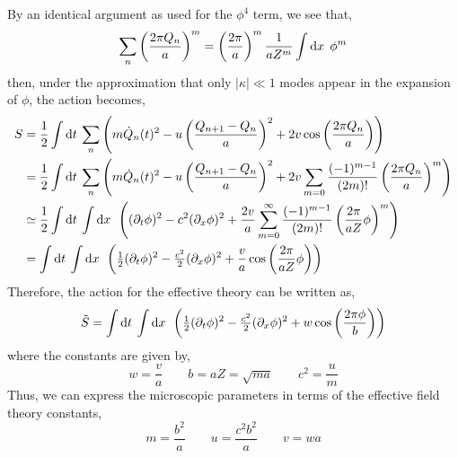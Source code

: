 \documentclass[12pt]{extarticle}
\begin{document}
By an identical argument as used for the $\phi^4$ term, we see that,
\[ \sum_{n} \left(\frac{2 \pi Q_n}{a} \right)^m = \left(\frac{2 \pi}{a} \right)^m \frac{1}{a Z^m} \int \mathrm{d}x \: \: \phi^m \]
then, under the approximation that only $|\kappa| \ll 1$ modes appear in the expansion of $\phi$, the action becomes,
\begin{align*}
S & = \frac{1}{2} \int \mathrm{d}t \: \sum_{n} \left(m \dot{Q}_n(t)^2 - u \left(\frac{Q_{n+1} - Q_{n}}{a}\right)^2 + 2 v \cos{\left(\frac{2 \pi Q_n}{a} \right)} \right) 
\\
& = \frac{1}{2} \int \mathrm{d}t \: \sum_{n} \left(m \dot{Q}_n(t)^2 - u \left(\frac{Q_{n+1} - Q_{n}}{a}\right)^2 + 2 v \sum_{m = 0} \frac{(-1)^{m-1}}{(2m)!} \left(\frac{2 \pi Q_n}{a}\right)^m \right) 
\\
& \simeq \frac{1}{2} \int \mathrm{d}t \: \int \mathrm{d}x \: \: \left( (\partial_t \phi)^2 - c^2 (\partial_x \phi)^2 + \frac{2 v}{a} \sum_{m = 0}^\infty \frac{(-1)^{m-1}}{(2m)!} \left(\frac{2 \pi}{a Z} \phi \right)^m \right) 
\\
& = \int \mathrm{d}t \: \int \mathrm{d}x \: \: \left( \tfrac{1}{2} (\partial_t \phi)^2 - \tfrac{c^2}{2} (\partial_x \phi)^2 + \frac{v}{a} \cos \left(\frac{2 \pi}{a Z} \phi \right) \right) 
\end{align*}
Therefore, the action for the effective theory can be written as,
\[\tilde{S} = \int \mathrm{d}t \: \int \mathrm{d}x \: \: \left( \tfrac{1}{2} (\partial_t \phi)^2 - \tfrac{c^2}{2} (\partial_x \phi)^2 + w \cos \left(\frac{2 \pi \phi}{b} \right) \right) \]
where the constants are given by,
\[w = \frac{v}{a} \quad \quad b = aZ = \sqrt{ma} \quad \quad c^2 = \frac{u}{m} \]
Thus, we can express the microscopic parameters in terms of the effective field theory constants,
\[ m = \frac{b^2}{a} \quad \quad u = \frac{c^2 b^2}{a} \quad \quad v = w a \]
\end{document}
